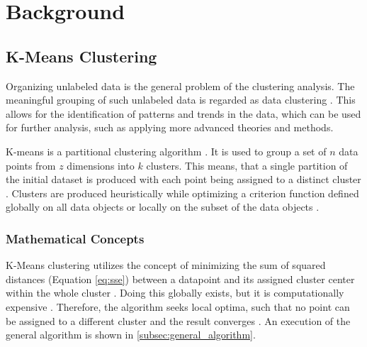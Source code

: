 \section{Background}
\label{cha:background}







\subsection{K-Means Clustering}
\label{sec:k_means_clustering}
Organizing unlabeled data \cite{EZU-CPF} is the general problem of the clustering analysis.
The meaningful grouping of such unlabeled data is regarded as data clustering \cite{ABI-RKC}.
This allows for the identification of patterns and trends in the data, which can be used for further analysis, such as applying more advanced theories and methods.

K-means is a partitional clustering algorithm \cite{SIN-UKC}.
It is used to group a set of $n$ data points from $z$ dimensions into $k$ clusters.
This means, that a single partition of the initial dataset is produced with each point being assigned to a distinct cluster \cite{SIN-UKC}.
Clusters are produced heuristically while optimizing a criterion function defined globally on all data objects or locally on the subset of the data objects \cite{ZHU-EPC}.

\subsubsection{Mathematical Concepts}
K-Means clustering utilizes the concept of minimizing the sum of squared distances (Equation \ref{eq:sse}) between a datapoint and its assigned cluster center within the whole cluster \cite{HAR-KMA}.
Doing this globally exists, but it is computationally expensive \cite{LIS-GKC}.
Therefore, the algorithm seeks local optima, such that no point can be assigned to a different cluster and the result converges \cite{SEL-GCT}.
An execution of the general algorithm is shown in \ref{subsec:general_algorithm}.


